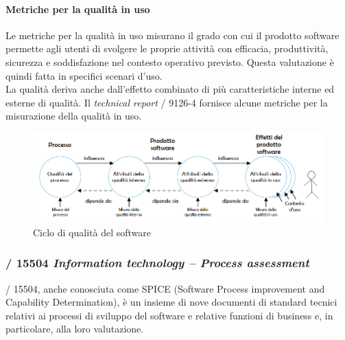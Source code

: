   \paragraph{Metriche per la qualità in uso}
    Le metriche per la qualità in uso misurano il grado con cui il prodotto software permette agli utenti di svolgere le proprie attività con efficacia, produttività, sicurezza e soddisfazione nel contesto operativo previsto.
    Questa valutazione è quindi fatta in specifici scenari d'uso.\\
    La qualità deriva anche dall'effetto combinato di più caratteristiche interne ed esterne di qualità.
    Il \emph{technical report} / 9126-4 fornisce alcune metriche per la misurazione della qualità in uso.\\

  \begin{figure}
    \includegraphics[width=1\textwidth]{res/sections/img/qdps.png}
    \caption{Ciclo di qualità del software}
    \centering
    \label{}
  \end{figure}


  \subsubsection{/ 15504 \emph{Information technology – Process assessment}}

  / 15504, anche conosciuta come SPICE (Software Process improvement and Capability Determination),
  è un insieme di nove documenti di standard tecnici relativi ai processi di sviluppo del software e relative funzioni di business e, in particolare, alla loro valutazione.


